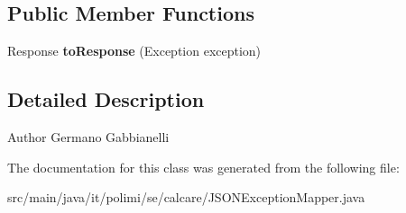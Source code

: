 \subsection*{Public Member Functions}
\begin{DoxyCompactItemize}
\item 
\hypertarget{classit_1_1polimi_1_1se_1_1calcare_1_1JSONExceptionMapper_aefc6967bbea80efc0415ee0a718946d0}{}Response {\bfseries to\+Response} (Exception exception)\label{classit_1_1polimi_1_1se_1_1calcare_1_1JSONExceptionMapper_aefc6967bbea80efc0415ee0a718946d0}

\end{DoxyCompactItemize}


\subsection{Detailed Description}
\begin{DoxyAuthor}{Author}
Germano Gabbianelli 
\end{DoxyAuthor}


The documentation for this class was generated from the following file\+:\begin{DoxyCompactItemize}
\item 
src/main/java/it/polimi/se/calcare/J\+S\+O\+N\+Exception\+Mapper.\+java\end{DoxyCompactItemize}
